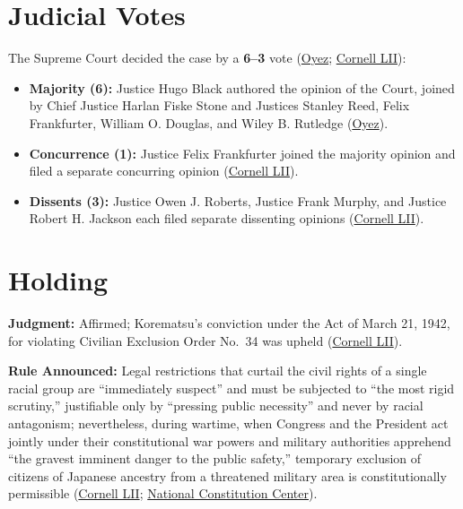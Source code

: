 \documentclass[12pt]{article}
\begin{document}
\section{Judicial Votes}
The Supreme Court decided the case by a \textbf{6--3} vote (\href{https://www.oyez.org/cases/1940-1955/323us214}{Oyez}; \href{https://www.law.cornell.edu/supremecourt/text/323/214}{Cornell LII}):
\begin{itemize}
    \item \textbf{Majority (6):} Justice Hugo Black authored the opinion of the Court, joined by Chief Justice Harlan Fiske Stone and Justices Stanley Reed, Felix Frankfurter, William O. Douglas, and Wiley B. Rutledge (\href{https://www.oyez.org/cases/1940-1955/323us214}{Oyez}).
    \item \textbf{Concurrence (1):} Justice Felix Frankfurter joined the majority opinion and filed a separate concurring opinion (\href{https://www.law.cornell.edu/supremecourt/text/323/214}{Cornell LII}).
    \item \textbf{Dissents (3):} Justice Owen J. Roberts, Justice Frank Murphy, and Justice Robert H. Jackson each filed separate dissenting opinions (\href{https://www.law.cornell.edu/supremecourt/text/323/214}{Cornell LII}).
\end{itemize}

\section{Holding}
\textbf{Judgment:} Affirmed; Korematsu's conviction under the Act of March 21, 1942, for violating Civilian Exclusion Order No.\ 34 was upheld (\href{https://www.law.cornell.edu/supremecourt/text/323/214}{Cornell LII}).

\textbf{Rule Announced:} Legal restrictions that curtail the civil rights of a single racial group are ``immediately suspect'' and must be subjected to ``the most rigid scrutiny,'' justifiable only by ``pressing public necessity'' and never by racial antagonism; nevertheless, during wartime, when Congress and the President act jointly under their constitutional war powers and military authorities apprehend ``the gravest imminent danger to the public safety,'' temporary exclusion of citizens of Japanese ancestry from a threatened military area is constitutionally permissible (\href{https://www.law.cornell.edu/supremecourt/text/323/214}{Cornell LII}; \href{https://constitutioncenter.org/blog/on-this-day-the-supreme-court-issues-the-korematsu-decision}{National Constitution Center}).
\end{document}
